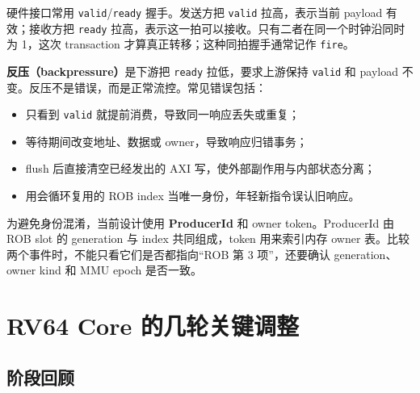 \documentclass[UTF8,a4paper,zihao=-4,oneside]{ctexart}
\begin{document}
硬件接口常用 \texttt{valid}/\texttt{ready} 握手。发送方把 \texttt{valid} 拉高，表示当前 payload 有效；接收方把 \texttt{ready} 拉高，表示这一拍可以接收。只有二者在同一个时钟沿同时为 1，这次 transaction 才算真正转移；这种同拍握手通常记作 \texttt{fire}。

\textbf{反压（backpressure）}是下游把 \texttt{ready} 拉低，要求上游保持 \texttt{valid} 和 payload 不变。反压不是错误，而是正常流控。常见错误包括：

\begin{itemize}
  \item 只看到 \texttt{valid} 就提前消费，导致同一响应丢失或重复；
  \item 等待期间改变地址、数据或 owner，导致响应归错事务；
  \item flush 后直接清空已经发出的 AXI 写，使外部副作用与内部状态分离；
  \item 用会循环复用的 ROB index 当唯一身份，年轻新指令误认旧响应。
\end{itemize}

为避免身份混淆，当前设计使用 \textbf{ProducerId} 和 owner token。ProducerId 由 ROB slot 的 generation 与 index 共同组成，token 用来索引内存 owner 表。比较两个事件时，不能只看它们是否都指向“ROB 第 3 项”，还要确认 generation、owner kind 和 MMU epoch 是否一致。

\section{RV64 Core 的几轮关键调整}

\subsection{阶段回顾}
\end{document}
